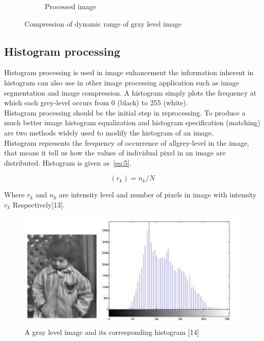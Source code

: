 \begin{figure}[h]
\begin{subfigure}[b]{0.46\textwidth}
                        \caption{Processed image}
                \end{subfigure}
                \caption{Compression of dynamic range of gray level image}
        \end{figure}
        \vspace{2cm}
\subsection{Histogram processing}
Histogram processing is used in image enhancement the information inherent in histogram can also use in
other image processing application such as image segmentation and image compression. A histogram simply
plots the frequency at which each grey-level occurs from 0 (black) to 255 (white).\\
Histogram processing should be the initial step in reprocessing. To produce a much better image histogram
equalization and histogram specification (matching) are two methods widely used to modify the histogram of an image.\\
Histogram represents the frequency of occurrence of allgrey-level in the image, that means it tell
us how the values of individual pixel in an image are distributed.
Histogram is given as~\ref{eq:5}.

        \begin{equation}
                (r_k) = n_k/N\label{eq:5}
        \end{equation}

Where $r_k$ and $n_k$ are intensity level and number of pixels in image with intensity $r_k$ Respectively[13].

        \begin{figure}[h]
                \centering
                \includegraphics[width=12cm]{chapiter1/figures/image-and-hist.png}
                \setlength{\fboxrule}{2pt}
                \caption{A gray level image and its corresponding histogram [14]}
        \end{figure}

